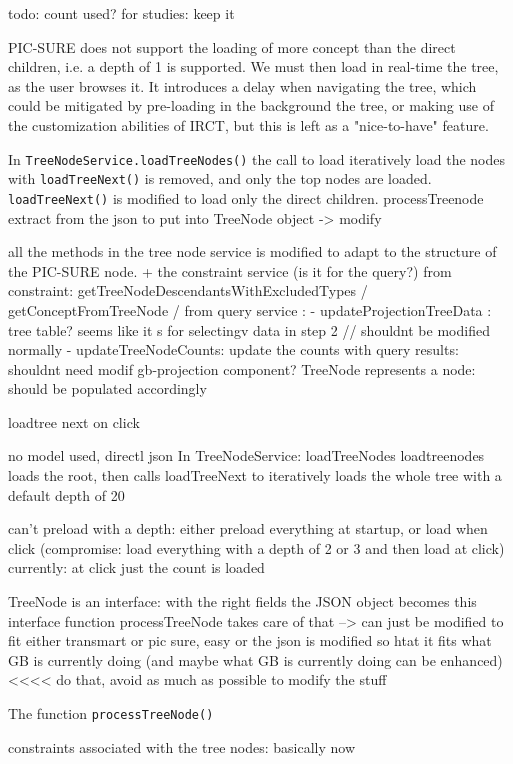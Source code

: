 todo: count used? for studies: keep it

PIC-SURE does not support the loading of more concept than the direct children, i.e. a depth of 1 is supported.
We must then load in real-time the tree, as the user browses it.
It introduces a delay when navigating the tree, which could be mitigated by pre-loading in the background the tree, or making use of the customization abilities of IRCT, but this is left as a "nice-to-have" feature.

In \verb|TreeNodeService.loadTreeNodes()| the call to load iteratively load the nodes with \verb|loadTreeNext()| is removed, and only the top nodes are loaded.
\verb|loadTreeNext()| is modified to load only the direct children.
processTreenode extract from the json to put into TreeNode object -> modify

all the methods in the tree node service is modified to adapt to the structure of the PIC-SURE node. + the constraint service (is it for the query?)
from constraint: getTreeNodeDescendantsWithExcludedTypes / getConceptFromTreeNode / 
from query service : 
- updateProjectionTreeData : tree table? seems like it s for selectingv data in step 2 // shouldnt be modified normally
- updateTreeNodeCounts: update the counts with query results: shouldnt need modif
gb-projection component?
TreeNode represents a node: should be populated accordingly 

loadtree next on click

no model used, directl json
In TreeNodeService:
loadTreeNodes
loadtreenodes loads the root, then calls loadTreeNext to iteratively loads the whole tree with a default depth of 20

can't preload with a depth: either preload everything at startup, or load when click (compromise: load everything with a depth of 2 or 3 and then load at click)
currently: at click just the count is loaded


TreeNode is an interface: with the right fields the JSON object becomes this interface
function processTreeNode takes care of that --> can just be modified to fit either transmart or pic sure, easy
or the json is modified so htat it fits what GB is currently doing (and maybe what GB is currently doing can be enhanced) <<<< do that, avoid as much as possible to modify the stuff 

The function \verb|processTreeNode()|

constraints associated with the tree nodes: basically now 



